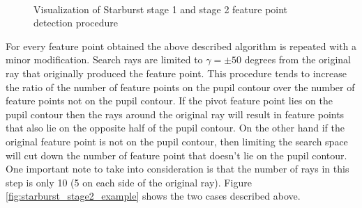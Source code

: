 \documentclass[12pt,fleqn]{book} %
\begin{document}
\begin{figure}[]
\begin{dBox}
\centering
  \mbox{
   }
   \caption{Visualization of Starburst stage 1 and stage 2 feature point detection procedure \label{fig:starburst_example} }   
\end{dBox}   
\end{figure}

For every feature point obtained the above described algorithm is repeated with a minor modification. Search rays are limited to $\gamma = \pm 50$ degrees from the original ray that originally produced the feature point. This procedure tends to increase the ratio of the number of feature points on the pupil contour over the number of feature points not on the pupil contour. If the pivot feature point lies on the pupil contour then the rays around the original ray will result in feature points that also lie on the opposite half of the pupil contour. On the other hand if the original feature point is not on the pupil contour, then limiting the search space will cut down the number of feature point that doesn't lie on the pupil contour. One important note to take into consideration is that the number of rays in this step is only 10 (5 on each side of the original ray). Figure \ref{fig:starburst_stage2_example} shows the two cases described above. \bigskip
\end{document}
